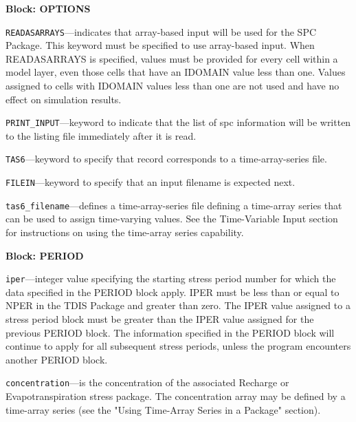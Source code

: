 
\item \textbf{Block: OPTIONS}

\begin{description}
\item \texttt{READASARRAYS}---indicates that array-based input will be used for the SPC Package.  This keyword must be specified to use array-based input.  When READASARRAYS is specified, values must be provided for every cell within a model layer, even those cells that have an IDOMAIN value less than one.  Values assigned to cells with IDOMAIN values less than one are not used and have no effect on simulation results.

\item \texttt{PRINT\_INPUT}---keyword to indicate that the list of spc information will be written to the listing file immediately after it is read.

\item \texttt{TAS6}---keyword to specify that record corresponds to a time-array-series file.

\item \texttt{FILEIN}---keyword to specify that an input filename is expected next.

\item \texttt{tas6\_filename}---defines a time-array-series file defining a time-array series that can be used to assign time-varying values. See the Time-Variable Input section for instructions on using the time-array series capability.

\end{description}
\item \textbf{Block: PERIOD}

\begin{description}
\item \texttt{iper}---integer value specifying the starting stress period number for which the data specified in the PERIOD block apply.  IPER must be less than or equal to NPER in the TDIS Package and greater than zero.  The IPER value assigned to a stress period block must be greater than the IPER value assigned for the previous PERIOD block.  The information specified in the PERIOD block will continue to apply for all subsequent stress periods, unless the program encounters another PERIOD block.

\item \texttt{concentration}---is the concentration of the associated Recharge or Evapotranspiration stress package.  The concentration array may be defined by a time-array series (see the "Using Time-Array Series in a Package" section).

\end{description}

